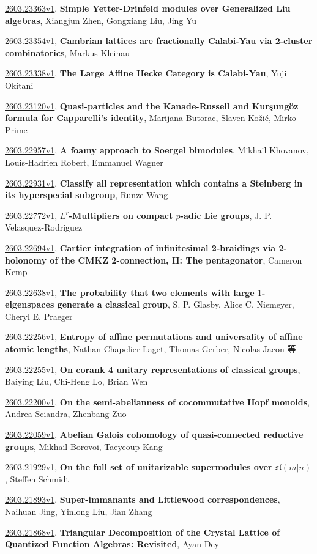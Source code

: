 \documentclass[9pt, a4paper]{article}
\theoremstyle{plain}
\theoremstyle{definition}
\theoremstyle{remark}
\newcommand{\arxiv}[3]{\href{https://arxiv.org/abs/#1}{#1}, \textbf{\textcolor{arxivblue}{#2}}, #3}
\begin{document}
\arxiv{2603.23363v1}{Simple Yetter-Drinfeld modules over Generalized Liu algebras}{Xiangjun Zhen, Gongxiang Liu, Jing Yu}

\arxiv{2603.23354v1}{Cambrian lattices are fractionally Calabi-Yau via 2-cluster combinatorics}{Markus Kleinau}

\arxiv{2603.23338v1}{The Large Affine Hecke Category is Calabi-Yau}{Yuji Okitani}

\arxiv{2603.23120v1}{Quasi-particles and the Kanade-Russell and Kurşungöz formula for Capparelli's identity}{Marijana Butorac, Slaven Kožić, Mirko Primc}

\arxiv{2603.22957v1}{A foamy approach to Soergel bimodules}{Mikhail Khovanov, Louis-Hadrien Robert, Emmanuel Wagner}

\arxiv{2603.22931v1}{Classify all representation which contains a Steinberg in its hyperspecial subgroup}{Runze Wang}

\arxiv{2603.22772v1}{$L^r$-Multipliers on compact $p$-adic Lie groups}{J. P. Velasquez-Rodriguez}

\arxiv{2603.22694v1}{Cartier integration of infinitesimal 2-braidings via 2-holonomy of the CMKZ 2-connection, II: The pentagonator}{Cameron Kemp}

\arxiv{2603.22638v1}{The probability that two elements with large $1$-eigenspaces generate a classical group}{S. P. Glasby, Alice C. Niemeyer, Cheryl E. Praeger}

\arxiv{2603.22256v1}{Entropy of affine permutations and universality of affine atomic lengths}{Nathan Chapelier-Laget, Thomas Gerber, Nicolas Jacon 等}

\arxiv{2603.22255v1}{On corank 4 unitary representations of classical groups}{Baiying Liu, Chi-Heng Lo, Brian Wen}

\arxiv{2603.22200v1}{On the semi-abelianness of cocommutative Hopf monoids}{Andrea Sciandra, Zhenbang Zuo}

\arxiv{2603.22059v1}{Abelian Galois cohomology of quasi-connected reductive groups}{Mikhail Borovoi, Taeyeoup Kang}

\arxiv{2603.21929v1}{On the full set of unitarizable supermodules over $\mathfrak{sl}(m\vert n)$}{Steffen Schmidt}

\arxiv{2603.21893v1}{Super-immanants and Littlewood correspondences}{Naihuan Jing, Yinlong Liu, Jian Zhang}

\arxiv{2603.21868v1}{Triangular Decomposition of the Crystal Lattice of Quantized Function Algebras: Revisited}{Ayan Dey}
\end{document}
